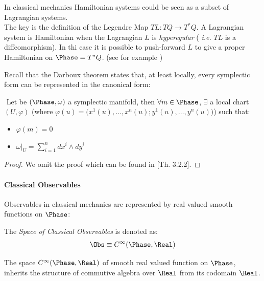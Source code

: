 \documentclass[Main]{subfiles}
\begin{document}
	\begin{remark}
		In classical mechanics Hamiltonian systems could be seen as a subset of Lagrangian systems.
		\\
		The key is the definition of the Legendre Map $TL: TQ \rightarrow T^*Q$.
		A Lagrangian system is Hamiltonian when the Lagrangian $L$  is \emph{hyperegular}  ( \textit{i.e.} $TL$ is a diffeomorphism). In thi case it is possible to push-forward $L$ to give a proper Hamiltonian on $\Phase=T^*Q$. (see for example \cite{Abraham1978})
	\end{remark}	
	Recall that the Darboux theorem states that, at least locally, every symplectic form can be represented in the canonical form:
	\begin{theorem}[Darboux]
		$ $
			Let be $(\Phase, \omega)$ a symplectic manifold, then
			 $\forall m\in \Phase$,  $\exists$ a local chart  $(U,\varphi)$ (where $\varphi(u) = \big(x^1(u), \ldots, x^n(u); y^1(u),\ldots, y^n(u) \big)$) such that:
					\begin{itemize}
						\item $\varphi(m) =0$
						\item	$\omega \big\vert_U = \sum_{i=1}^n dx^i \wedge dy^i$
					\end{itemize}
	\end{theorem}
	\begin{proof}
		We omit the proof which can be found in \cite{Abraham1978}[Th. 3.2.2].
	\end{proof}		
		
	\paragraph{Classical Observables}
		Observables in classical mechanics are represented by real valued smooth functions on $\Phase$:
	\begin{definition}
		The \emph{Space of Classical Observables} is denoted as:
		\begin{displaymath}
			\Obs \equiv		C^\infty(\Phase,\Real)
		\end{displaymath}
	\end{definition}
%
		The space  $C^\infty(\Phase,\Real)$ of smooth real valued function on $\Phase$,  inherits the structure of commutive algebra over $\Real$ from its codomain $\Real$.
\end{document}
